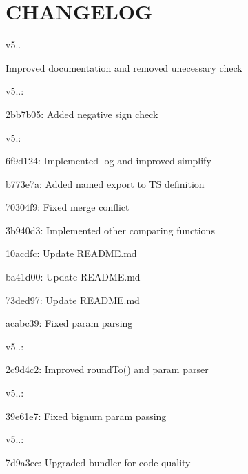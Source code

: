 \chapter{CHANGELOG }
\hypertarget{md_frontend_2node__modules_2fraction_8js_2_c_h_a_n_g_e_l_o_g}{}\label{md_frontend_2node__modules_2fraction_8js_2_c_h_a_n_g_e_l_o_g}
\label{md_frontend_2node__modules_2fraction_8js_2_c_h_a_n_g_e_l_o_g_autotoc_md6914}%
%


v5..
\begin{DoxyItemize}
\item Improved documentation and removed unecessary check
\end{DoxyItemize}

v5..:\+
\begin{DoxyItemize}
\item 2bb7b05:\+ Added negative sign check
\end{DoxyItemize}

v5.:\+
\begin{DoxyItemize}
\item 6f9d124:\+ Implemented log and improved simplify
\item b773e7a:\+ Added named export to TS definition
\item 70304f9:\+ Fixed merge conflict
\item 3b940d3:\+ Implemented other comparing functions
\item 10acdfc:\+ Update README.\+md
\item ba41d00:\+ Update README.\+md
\item 73ded97:\+ Update README.\+md
\item acabc39:\+ Fixed param parsing
\end{DoxyItemize}

v5..:\+
\begin{DoxyItemize}
\item 2c9d4c2:\+ Improved round\+To() and param parser
\end{DoxyItemize}

v5..:\+
\begin{DoxyItemize}
\item 39e61e7:\+ Fixed bignum param passing
\end{DoxyItemize}

v5..:\+
\begin{DoxyItemize}
\item 7d9a3ec:\+ Upgraded bundler for code quality
\end{DoxyItemize}


